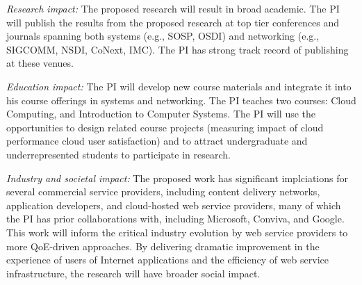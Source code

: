 \begin{packeditemize}
\item {\em Research impact:}
The proposed research will result in broad academic.
The PI will publish the results from the proposed research at top tier conferences and journals spanning both systems (e.g., SOSP, OSDI) and networking (e.g., SIGCOMM, NSDI, CoNext, IMC).
The PI has strong track record of publishing at these venues.

\item {\em Education impact:}
The PI will develop new course materials and integrate it into his course offerings in systems and networking. 
The PI teaches two courses: Cloud Computing, and Introduction to Computer Systems. The PI will use the opportunities to design related course projects (\eg measuring impact of cloud performance cloud user satisfaction) and to attract undergraduate and underrepresented students to participate in research.

\item {\em Industry and societal impact:}
The proposed work has significant implciations for several commercial service providers, including content delivery networks, application developers, and cloud-hosted web service providers, many of which the PI has prior collaborations with, including Microsoft, Conviva, and Google. 
This work will inform the critical industry evolution by  web service providers to more QoE-driven approaches.
By delivering dramatic improvement in the experience of users of Internet applications and the efficiency of web service infrastructure, the research will have broader social impact. 


\end{packeditemize}
